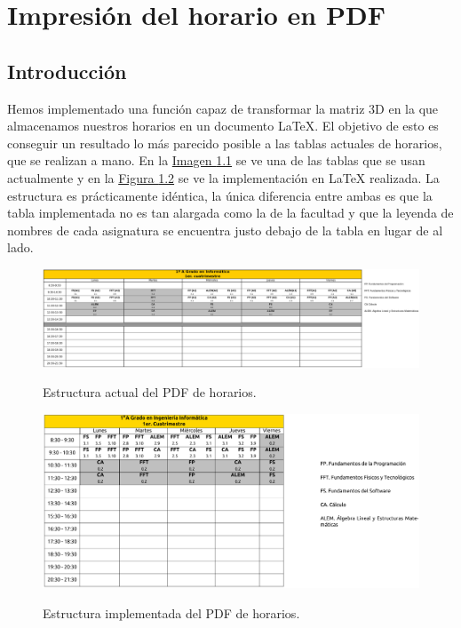 \chapter{Impresión del horario en PDF}

\section{Introducción}
Hemos implementado una función capaz de transformar la matriz 3D en la que almacenamos nuestros horarios en un documento \LaTeX. El objetivo de esto es conseguir un resultado lo más parecido posible a las tablas actuales de horarios, que se realizan a mano. En la \hyperref[horario_actual]{Imagen \ref*{horario_actual}} se ve una de las tablas que se usan actualmente y en la \hyperref[horario_implementado]{Figura \ref*{horario_implementado}} se ve la implementación en \LaTeX\; realizada. La estructura es prácticamente idéntica, la única diferencia entre ambas es que la tabla implementada no es tan alargada como la de la facultad y que la leyenda de nombres de cada asignatura se encuentra justo debajo de la tabla en lugar de al lado.

\begin{figure}[H]
    \centering
    \includegraphics[width=\textwidth]{img/horario_actual}
    \label{horario_actual}
    \caption{Estructura actual del PDF de horarios.}
\end{figure}

\begin{figure}[H]
    \centering
    \includegraphics[width=\textwidth]{img/horario_implementado}
    \label{horario_implementado}
    \caption{Estructura implementada del PDF de horarios.}
\end{figure}

